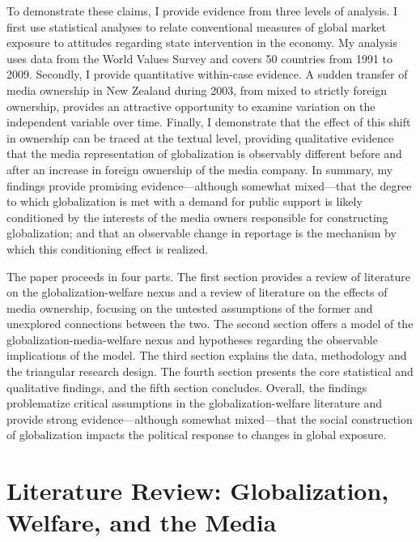 \documentclass[12pt]{report}
\begin{document}
	To demonstrate these claims, I provide evidence from three levels of analysis. I first use
	statistical analyses to relate conventional measures of global market exposure to attitudes
	regarding state intervention in the economy. My analysis uses data from the World Values Survey
	and covers 50 countries from 1991 to 2009. Secondly, I provide quantitative within-case
	evidence. A sudden transfer of media ownership in New Zealand during 2003, from mixed to
	strictly foreign ownership, provides an attractive opportunity to examine variation on the
	independent variable over time. Finally, I demonstrate that the effect of this shift in
	ownership can be traced at the textual level, providing qualitative evidence that the media
	representation of globalization is observably different before and after an increase in foreign
	ownership of the media company. In summary, my findings provide promising evidence---although
	somewhat mixed---that the degree to which globalization is met with a demand for public support
	is likely conditioned by the interests of the media owners responsible for constructing
	globalization; and that an observable change in reportage is the mechanism by which this
	conditioning effect is realized.

The paper proceeds in four parts. The first section provides a review of literature on the
globalization-welfare nexus and a review of literature on the effects of media ownership, focusing
on the untested assumptions of the former and unexplored connections between the two. The second
section offers a model of the globalization-media-welfare nexus and hypotheses regarding the
observable implications of the model. The third section explains the data, methodology and the
triangular research design. The fourth section presents the core statistical and qualitative
findings, and the fifth section concludes. Overall, the findings problematize critical assumptions
in the globalization-welfare literature and provide strong evidence---although somewhat mixed---that
the social construction of globalization impacts the political response to changes in global
exposure.

\section{Literature Review: Globalization, Welfare, and the Media}
\end{document}
